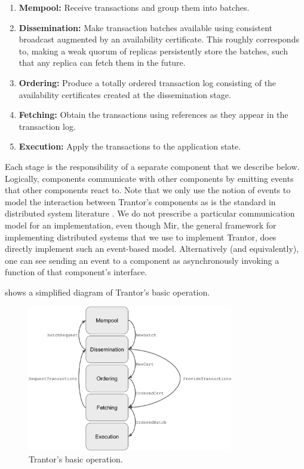 \documentclass{article}
\begin{document}
\begin{enumerate}

    \item \textbf{Mempool:} Receive transactions and group them into batches.

    \item \textbf{Dissemination:} Make transaction batches available using consistent broadcast \cite{distributedprogrammingbook} augmented by an availability certificate.
    This roughly corresponds to, making a weak quorum of replicas persistently store the batches, such that any replica can fetch them in the future.

    \item \textbf{Ordering:} Produce a totally ordered transaction log consisting of the availability certificates created at the dissemination stage.

    \item \textbf{Fetching:} Obtain the transactions using references as they appear in the transaction log.

    \item \textbf{Execution:} Apply the transactions to the application state.

\end{enumerate}

Each stage is the responsibility of a separate component that we describe below.
Logically, components communicate with other components by emitting events that other components react to.
Note that we only use the notion of events to model the interaction between Trantor's components
as is the standard in distributed system literature \cite{distributedprogrammingbook}.
We do not prescribe a particular communication model for an implementation,
even though Mir, the general framework for implementing distributed systems \cite{mir} that we use to implement Trantor,
does directly implement such an event-based model.
Alternatively (and equivalently), one can see sending an event to a component as asynchronously invoking a function of that component's interface.

 shows a simplified diagram of Trantor’s basic operation.

\begin{figure}[h]
    \centering
    \includegraphics[width=0.8\textwidth]{figures/basic-operation.png}
    \caption{Trantor's basic operation.}
    \label{fig:basic-operation}
\end{figure}
\end{document}
